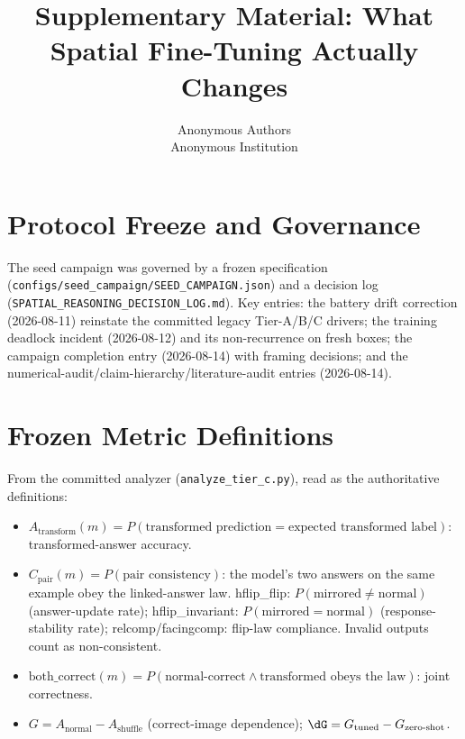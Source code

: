 \documentclass[10pt,twocolumn,letterpaper]{article}
\title{Supplementary Material: What Spatial Fine-Tuning Actually Changes}
\author{Anonymous Authors\\
Anonymous Institution}
\begin{document}
\maketitle

\section{Protocol Freeze and Governance}
The seed campaign was governed by a frozen specification
(\texttt{configs/seed\_campaign/SEED\_CAMPAIGN.json}) and a decision log
(\texttt{SPATIAL\_REASONING\_DECISION\_LOG.md}). Key entries: the battery
drift correction (2026-08-11) reinstate the committed legacy Tier-A/B/C
drivers; the training deadlock incident (2026-08-12) and its non-recurrence
on fresh boxes; the campaign completion entry (2026-08-14) with framing
decisions; and the numerical-audit/claim-hierarchy/literature-audit
entries (2026-08-14).

\section{Frozen Metric Definitions}
From the committed analyzer (\texttt{analyze\_tier\_c.py}), read as the
authoritative definitions:
\begin{itemize}[leftmargin=*]
  \item $A_{\text{transform}}(m) = P(\text{transformed prediction} =
        \text{expected transformed label})$: transformed-answer accuracy.
  \item $C_{\text{pair}}(m) = P(\text{pair consistency})$: the model's two
        answers on the same example obey the linked-answer law.
        hflip\_flip: $P(\text{mirrored} \neq \text{normal})$ (answer-update
        rate); hflip\_invariant: $P(\text{mirrored} = \text{normal})$
        (response-stability rate); relcomp/facingcomp: flip-law
        compliance. Invalid outputs count as non-consistent.
  \item $\text{both\_correct}(m) = P(\text{normal-correct} \wedge
        \text{transformed obeys the law})$: joint correctness.
  \item $G = A_{\text{normal}} - A_{\text{shuffle}}$ (correct-image
        dependence); $\dG = G_{\text{tuned}} - G_{\text{zero-shot}}$.
\end{itemize}
\end{document}
